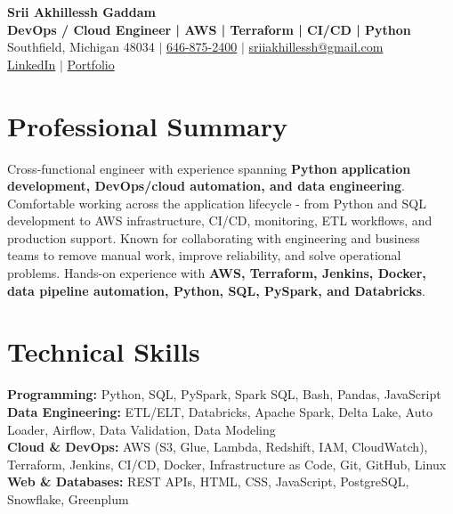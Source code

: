\documentclass[letterpaper,10pt]{article}
\begin{document}
\fontsize{9.35pt}{10.45pt}\selectfont

\begin{center}
    {\LARGE \textbf{Srii Akhillessh Gaddam}} \\[-1pt]
    \textbf{DevOps / Cloud Engineer | AWS | Terraform | CI/CD | Python} \\[2pt]
    Southfield, Michigan 48034 $|$
    \href{tel:6468752400}{646-875-2400} $|$
    \href{mailto:sriiakhillessh@gmail.com}{sriiakhillessh@gmail.com} \\[1pt]
    \href{https://www.linkedin.com/in/srii-akhiilessh-gaddam-b48668191/}{LinkedIn} $|$
    \href{https://sriiakhillesshg.github.io/portfolio/}{Portfolio}
\end{center}
\vspace{-8pt}

\section{Professional Summary}
\small{Cross-functional engineer with experience spanning \textbf{Python application development, DevOps/cloud automation, and data engineering}. Comfortable working across the application lifecycle - from Python and SQL development to AWS infrastructure, CI/CD, monitoring, ETL workflows, and production support. Known for collaborating with engineering and business teams to remove manual work, improve reliability, and solve operational problems. Hands-on experience with \textbf{AWS, Terraform, Jenkins, Docker, data pipeline automation, Python, SQL, PySpark, and Databricks}.}

\section{Technical Skills}
\small{
\textbf{Programming:} Python, SQL, PySpark, Spark SQL, Bash, Pandas, JavaScript \\
\textbf{Data Engineering:} ETL/ELT, Databricks, Apache Spark, Delta Lake, Auto Loader, Airflow, Data Validation, Data Modeling \\
\textbf{Cloud \& DevOps:} AWS (S3, Glue, Lambda, Redshift, IAM, CloudWatch), Terraform, Jenkins, CI/CD, Docker, Infrastructure as Code, Git, GitHub, Linux \\
\textbf{Web \& Databases:} REST APIs, HTML, CSS, JavaScript, PostgreSQL, Snowflake, Greenplum
}
\end{document}
